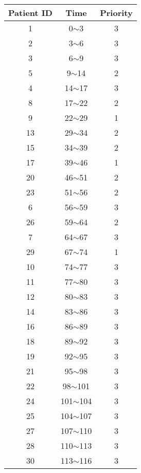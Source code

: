 \documentclass[12pt,a4paper]{article}
\begin{document}
\begin{center}
\begin{tabular}{|c|c|c|}
\hline
Patient ID & Time & Priority \\
\hline
1 & 0$\sim$3 & 3 \\
2 & 3$\sim$6 & 3 \\
3 & 6$\sim$9 & 3 \\
5 & 9$\sim$14 & 2 \\
4 & 14$\sim$17 & 3 \\
8 & 17$\sim$22 & 2 \\
9 & 22$\sim$29 & 1 \\
13 & 29$\sim$34 & 2 \\
15 & 34$\sim$39 & 2 \\
17 & 39$\sim$46 & 1 \\
20 & 46$\sim$51 & 2 \\
23 & 51$\sim$56 & 2 \\
6 & 56$\sim$59 & 3 \\
26 & 59$\sim$64 & 2 \\
7 & 64$\sim$67 & 3 \\
29 & 67$\sim$74 & 1 \\
10 & 74$\sim$77 & 3 \\
11 & 77$\sim$80 & 3 \\
12 & 80$\sim$83 & 3 \\
14 & 83$\sim$86 & 3 \\
16 & 86$\sim$89 & 3 \\
18 & 89$\sim$92 & 3 \\
19 & 92$\sim$95 & 3 \\
21 & 95$\sim$98 & 3 \\
22 & 98$\sim$101 & 3 \\
24 & 101$\sim$104 & 3 \\
25 & 104$\sim$107 & 3 \\
27 & 107$\sim$110 & 3 \\
28 & 110$\sim$113 & 3 \\
30 & 113$\sim$116 & 3 \\
\hline
\end{tabular}
\end{center}
\end{document}
